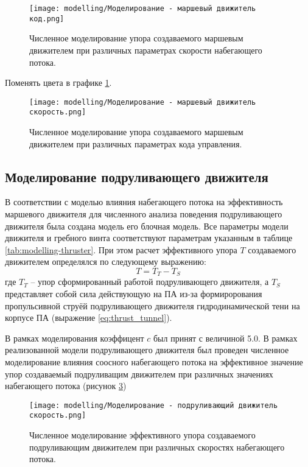 \begin{figure}[ht]
    \centering
    \texttt{[image: modelling/Моделирование - маршевый движитель код.png]}
    \caption{Численное моделирование упора создаваемого маршевым движителем при различных параметрах скорости набегающего потока.}
    \label{fig:modelling-thruster-velocity}
\end{figure}

\begin{noteplan}
    Поменять цвета в графике \ref{fig:modelling-thruster-velocity}.
\end{noteplan}

\begin{figure}[ht]
    \centering
    \texttt{[image: modelling/Моделирование - маршевый движитель скорость.png]}
    \caption{Численное моделирование упора создаваемого маршевым движителем при различных параметрах кода управления.}
    \label{fig:modelling-thruster-code}
\end{figure}

\subsection{Моделирование подруливающего движителя}

В соответствии с моделью влияния набегающего потока на эффективность маршевого движителя для численного анализа поведения подруливающего движителя была создана модель его блочная модель.
Все параметры модели движителя и гребного винта соответствуют параметрам указанным в таблице \ref{tab:modelling-thruster}.
При этом расчет эффективного упора $T$ создаваемого движителем определялся по следующему выражению:
\begin{equation*}
    T = T_T - T_S
\end{equation*}
\noindent где $T_T$ -- упор сформированный работой подруливающего движителя, а $T_S$ представляет собой сила действующую на ПА из-за формирорования пропульсивной струёй подруливающего движителя гидродинамической тени на корпусе ПА (выражение \ref{eq:thrust_tunnel}).

В рамках моделирования коэффицент $c$ был принят с величиной 5.0.
В рамках реализованной модели подруливающего движителя был проведен численное моделирование влияния соосного набегающего потока на эффективное значение упор создаваемый подруливащим движителем при различных значениях набегающего потока (рисунок \ref{fig:modelling-tunnel-velocity})

\begin{figure}[ht]
    \centering
    \texttt{[image: modelling/Моделирование - подруливающий движитель скорость.png]}
    \caption{Численное моделирование эффективного упора создаваемого подруливающим движителем при различных скоростях набегающего потока.}
    \label{fig:modelling-tunnel-velocity}
\end{figure}

